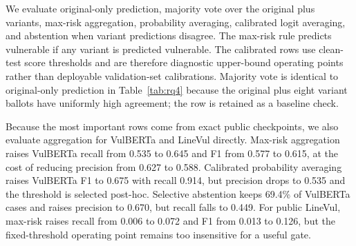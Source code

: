 \documentclass[a4paper,fleqn]{cas-dc}
\begin{document}
We evaluate original-only prediction, majority vote over the original plus
variants, max-risk aggregation, probability averaging, calibrated logit
averaging, and abstention when variant predictions disagree. The max-risk rule
predicts vulnerable if any variant is predicted vulnerable. The calibrated rows
use clean-test score thresholds and are therefore diagnostic upper-bound
operating points rather than deployable validation-set calibrations.
Majority vote is identical to original-only prediction in
Table~\ref{tab:rq4} because the original plus eight variant ballots have
uniformly high agreement; the row is retained as a baseline check.

\begin{table}[t]
  \centering
  \caption{Aggregation mitigation results on CodeXGLUE/Devign.}
  \label{tab:rq4}
\end{table}

Because the most important rows come from exact public checkpoints, we also
evaluate aggregation for VulBERTa and LineVul directly. Max-risk aggregation
raises VulBERTa recall from 0.535 to 0.645 and F1 from 0.577 to 0.615, at the
cost of reducing precision from 0.627 to 0.588. Calibrated probability averaging
raises VulBERTa F1 to 0.675 with recall 0.914, but precision drops to 0.535 and
the threshold is selected post-hoc. Selective abstention keeps 69.4\% of
VulBERTa cases and raises precision to 0.670, but recall falls to 0.449. For
public LineVul, max-risk raises recall from 0.006 to 0.072 and F1 from 0.013 to
0.126, but the fixed-threshold operating point remains too insensitive for a
useful gate.
\end{document}
